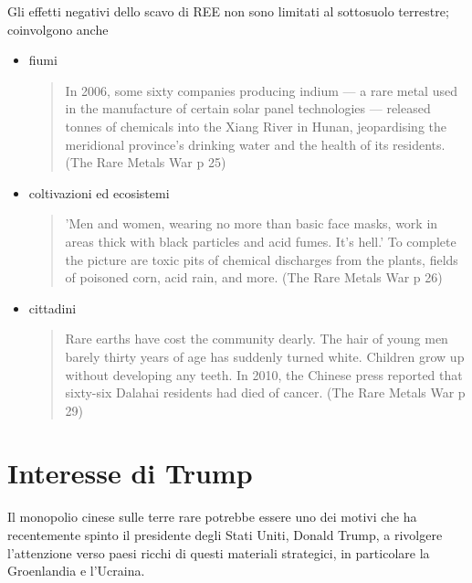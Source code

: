 \documentclass[12pt,a4paper,oneside]{book}
\begin{document}
Gli effetti negativi dello scavo di REE non sono limitati al sottosuolo terrestre; coinvolgono anche

\begin{itemize}
\item fiumi
\begin{quote}
\small
In 2006, some sixty companies producing indium — a rare metal used in the manufacture of certain solar panel technologies — released tonnes of chemicals into the Xiang River in Hunan, jeopardising the meridional province’s drinking water and the health of its residents. (The Rare Metals War p 25)
\end{quote}

\item coltivazioni ed ecosistemi
\begin{quote}
\small
'Men and women, wearing no more than basic face masks, work in areas thick with black particles and acid fumes. It’s hell.' To complete the picture are toxic pits of chemical discharges from the plants, fields of poisoned corn, acid rain, and more. (The Rare Metals War p 26)
\end{quote}

\item cittadini
\begin{quote}
\small
Rare earths have cost the community dearly. The hair of young men barely thirty years of age has suddenly turned white. Children grow up without developing any teeth. In 2010, the Chinese press reported that sixty-six Dalahai residents had died of cancer. (The Rare Metals War p 29)
\end{quote}
    
\end{itemize}

\section{Interesse di Trump}
Il monopolio cinese sulle terre rare potrebbe essere uno dei motivi che ha recentemente spinto il presidente degli Stati Uniti, Donald Trump, a rivolgere l'attenzione verso paesi ricchi di questi materiali strategici, in particolare la Groenlandia e l'Ucraina.
\end{document}
